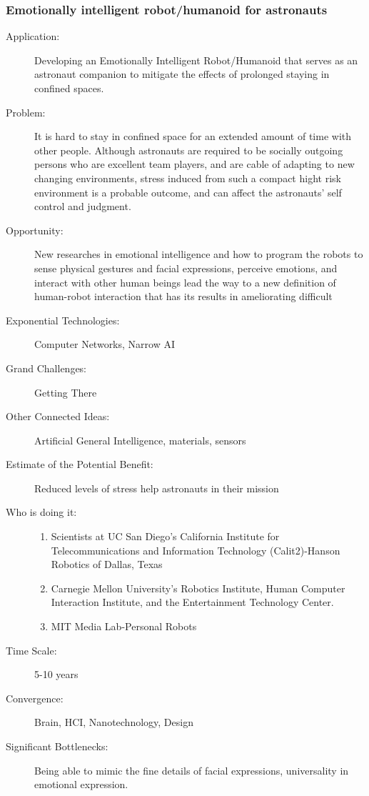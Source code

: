  
\subsubsection{Emotionally  intelligent robot/humanoid for astronauts}
\label{companion}
\begin{description}  \item[Application:] Developing an Emotionally Intelligent  Robot/Humanoid that serves as an astronaut companion to mitigate the  effects of prolonged staying in confined spaces.
\item[Problem:]  It is hard to stay in confined space for an extended amount of time  with other people. Although astronauts are required to be socially  outgoing persons who are excellent team players, and are cable of  adapting to new changing environments, stress induced from such a  compact hight risk environment is a probable outcome, and can affect the  astronauts' self control and judgment.
\item[Opportunity:]  New researches in emotional intelligence and how to program the robots  to sense physical gestures and facial expressions, perceive emotions,  and interact with other human beings lead the way to a new definition of  human-robot interaction that has its results in ameliorating difficult 
\item[Exponential  Technologies:] Computer Networks, Narrow AI
\item[Grand  Challenges:] Getting There
\item[Other Connected Ideas:]  Artificial General Intelligence, materials, sensors
\item[Estimate  of the Potential Benefit:] Reduced levels of stress help astronauts in  their mission
\item[Who is doing it:]
\hfill\begin{enumerate}
\item Scientists at UC San Diego's  California Institute for Telecommunications and Information Technology  (Calit2)-Hanson Robotics of Dallas, Texas
\item Carnegie Mellon University's Robotics  Institute, Human Computer Interaction Institute, and the Entertainment  Technology Center.
\item MIT Media Lab-Personal Robots
\end{enumerate}
\item[Time Scale:] 5-10 years
\item[Convergence:]  Brain, HCI, Nanotechnology, Design
\item[Significant  Bottlenecks:] Being able to mimic the fine details of facial  expressions, universality in emotional expression.
\end{description}
 

